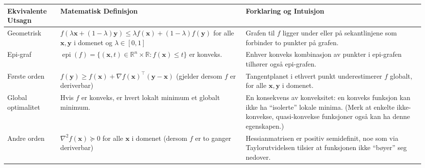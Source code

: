 \begin{table}[H]
	\centering
	\small
	\setlength{\tabcolsep}{6pt}
	\begin{tabularx}{\textwidth}{|>{\raggedright\arraybackslash}X|>{\raggedright\arraybackslash}X|>{\raggedright\arraybackslash}X|}
		\rowcolor{rem-color!25}
		\textbf{Ekvivalente Utsagn} & \textbf{Matematisk Definisjon}                                                                                                                                                     & \textbf{Forklaring og Intuisjon} \\
		\hline
		Geometrisk                  &
		\( f(\lambda \symbf{x} + (1-\lambda)\symbf{y}) \le \lambda f(\symbf{x}) + (1-\lambda)f(\symbf{y}) \)
		for alle \( \symbf{x},\symbf{y} \) i domenet og \( \lambda \in [0,1] \)
		                            & Grafen til \( f \) ligger under eller på sekantlinjene som forbinder to punkter på grafen.                                                                                                                            \\
		\hline
		Epi-graf                    &
		\(\operatorname{epi}(f) = \{ (\symbf{x},t)\in\mathbb{R}^n\times\mathbb{R} : f(\symbf{x})\le t \}\) er konveks.
		                            & Enhver konveks kombinasjon av punkter i epi-grafen tilhører også epi-grafen.                                                                                                                                          \\
		\hline
		Første orden                &
		\( f(\symbf{y}) \ge f(\symbf{x}) + \nabla f(\symbf{x})^\top (\symbf{y}-\symbf{x}) \)
		(gjelder dersom \( f \) er deriverbar)
		                            & Tangentplanet i ethvert punkt underestimerer \( f \) globalt, for alle \( \symbf{x},\symbf{y} \) i domenet.                                                                                                           \\
		\hline
		Global optimalitet          &
		Hvis \( f \) er konveks, er hvert lokalt minimum et globalt minimum.
		                            & En konsekvens av konveksitet: en konveks funksjon kan ikke ha ``isolerte'' lokale minima. (Merk at enkelte ikke-konvekse, quasi-konvekse funksjoner også kan ha denne egenskapen.)                                    \\\hline
		Andre orden                 &
		\( \nabla^2 f(\symbf{x}) \succeq 0 \) for alle \( \symbf{x} \) i domenet
		(dersom \( f \) er to ganger deriverbar)
		                            & Hessianmatrisen er positiv semidefinit, noe som via Taylorutvidelsen tilsier at funksjonen ikke ``bøyer'' seg nedover.                                                                                                \\

\end{tabularx}
\end{table}

